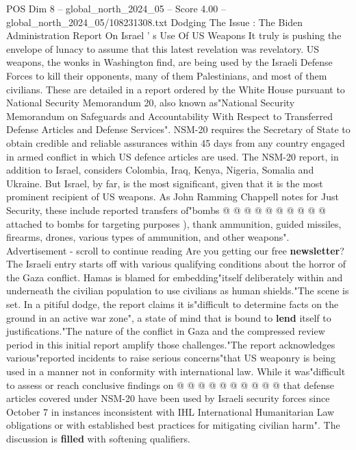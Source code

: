 \begin{textsample}{POS Dim 8 – global\_north\_2024\_05 – Score 4.00 – global\_north\_2024\_05/108231308.txt}  \label{ex:f8_pos_179}
Dodging The Issue : The Biden Administration Report On Israel ' s Use Of US Weapons It truly is pushing the envelope of lunacy to assume that this latest revelation was revelatory.
US weapons, the wonks in Washington find, are being used by the Israeli Defense Forces to kill their opponents, many of them Palestinians, and most of them civilians.
These are detailed in a report ordered by the White House pursuant to National Security Memorandum 20, also known as"National Security Memorandum on Safeguards and Accountability With Respect to Transferred Defense Articles and Defense Services".
NSM-20 requires the Secretary of State to obtain credible and reliable assurances within 45 days from any country engaged in armed conflict in which US defence articles are used.
The NSM-20 report, in addition to Israel, considers Colombia, Iraq, Kenya, Nigeria, Somalia and Ukraine.
But Israel, by far, is the most significant, given that it is the most prominent recipient of US weapons.
As John Ramming Chappell notes for Just Security, these include reported transfers of"bombs @ @ @ @ @ @ @ @ @ @ attached to bombs for targeting purposes ), thank ammunition, guided missiles, firearms, drones, various types of ammunition, and other weapons".
Advertisement - scroll to continue reading Are you getting our free \textbf{newsletter}?
The Israeli entry starts off with various qualifying conditions about the horror of the Gaza conflict.
Hamas is blamed for embedding"itself deliberately within and underneath the civilian population to use civilians as human shields."The scene is set.
In a pitiful dodge, the report claims it is"difficult to determine facts on the ground in an active war zone", a state of mind that is bound to \textbf{lend} itself to justifications."The nature of the conflict in Gaza and the compressed review period in this initial report amplify those challenges."The report acknowledges various"reported incidents to raise serious concerns"that US weaponry is being used in a manner not in conformity with international law.
While it was"difficult to assess or reach conclusive findings on @ @ @ @ @ @ @ @ @ @ that defense articles covered under NSM-20 have been used by Israeli security forces since October 7 in instances inconsistent with IHL International Humanitarian Law obligations or with established best practices for mitigating civilian harm".
The discussion is \textbf{filled} with softening qualifiers.

\end{textsample}
